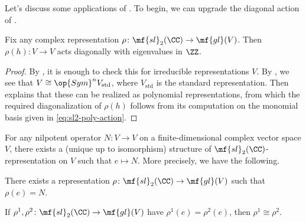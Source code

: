 \documentclass[../notes.tex]{subfiles}
\begin{document}
Let's discuss some applications of . To begin, we can upgrade the diagonal action of .
\begin{corollary} \label{cor:sl2-h-diagonalizes-better}
	Fix any complex representation $\rho\colon\mf{sl}_2(\CC)\to\mf{gl}(V)$. Then $\rho(h)\colon V\to V$ acts diagonally with eigenvalues in $\ZZ$.
\end{corollary}
\begin{proof}
	By , it is enough to check this for irreducible representations $V$. By , we see that $V\cong\op{Sym}^nV_{\mathrm{std}}$, where $V_{\mathrm{std}}$ is the standard representation. Then  explains that these can be realized as polynomial representations, from which the required diagonalization of $\rho(h)$ follows from its computation on the monomial basis given in \eqref{eq:sl2-poly-action}.
\end{proof}
\begin{corollary}
	For any nilpotent operator $N\colon V\to V$ on a finite-dimensional complex vector space $V$, there exists a (unique up to isomorphism) structure of $\mf{sl}_2(\CC)$-representation on $V$ such that $e\mapsto N$. More precisely, we have the following. 
	\begin{listalph}
		\item There exists a representation $\rho\colon\mf{sl}_2(\CC)\to\mf{gl}(V)$ such that $\rho(e)=N$.
		\item If $\rho^1,\rho^2\colon\mf{sl}_2(\CC)\to\mf{gl}(V)$ have $\rho^1(e)=\rho^2(e)$, then $\rho^1\cong\rho^2$.
	\end{listalph}
\end{corollary}
\end{document}
